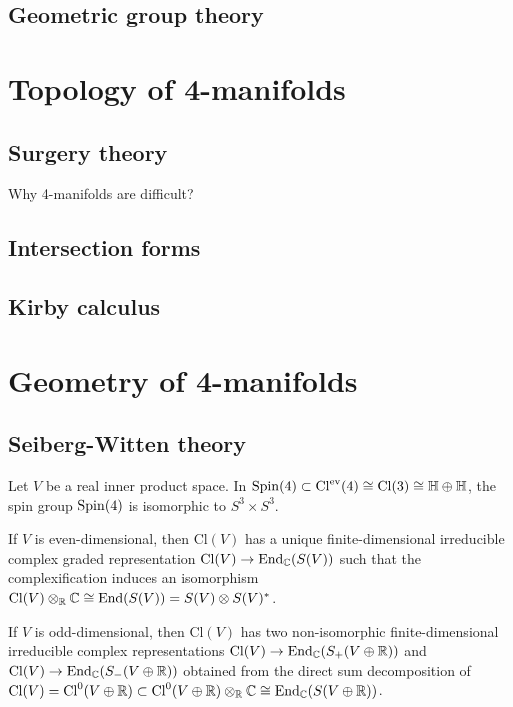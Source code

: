 \documentclass{../../large}
\newcommand{\Cl}{\mathrm{Cl}}
\begin{document}
\section{}

\chapter{Geometric group theory}
\section{}


\part{Topology of 4-manifolds}
\chapter{Surgery theory}
Why 4-manifolds are difficult?
\chapter{Intersection forms}
\chapter{Kirby calculus}






\part{Geometry of 4-manifolds}
\chapter{}
\chapter{Seiberg-Witten theory}

\begin{prb}
Let $V$ be a real inner product space.
In $\Spin(4)\subset\Cl^{\mathrm{ev}}(4)\cong\Cl(3)\cong\H\oplus\H$, the spin group $\mathrm{Spin}(4)$ is isomorphic to $S^3\times S^3$.

If $V$ is even-dimensional, then $\Cl(V)$ has a unique finite-dimensional irreducible complex graded representation $\Cl(V)\to\End_\C(S(V))$ such that the complexification induces an isomorphism $\Cl(V)\otimes_\R\C\cong\End(S(V))=S(V)\otimes S(V)^*$.

If $V$ is odd-dimensional, then $\Cl(V)$ has two non-isomorphic finite-dimensional irreducible complex representations $\Cl(V)\to\End_\C(S_+(V\oplus\R))$ and $\Cl(V)\to\End_\C(S_-(V\oplus\R))$ obtained from the direct sum decomposition of $\Cl(V)=\Cl^0(V\oplus\R)\subset\Cl^0(V\oplus\R)\otimes_\R\C\cong\End_\C(S(V\oplus\R))$.


\end{prb}






\chapter{}
\end{document}
